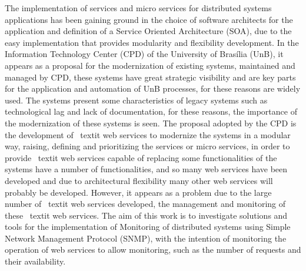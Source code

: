 The implementation of services and micro services for distributed systems applications has been gaining ground in the choice of software architects for the application and definition of a Service Oriented Architecture (SOA), due to the easy implementation that provides modularity and flexibility development. In the Information Technology Center (CPD) of the University of Brasília (UnB), it appears as a proposal for the modernization of existing systems, maintained and managed by CPD, these systems have great strategic visibility and are key parts for the application and automation of UnB processes, for these reasons are widely used. The systems present some characteristics of legacy systems such as technological lag and lack of documentation, for these reasons, the importance of the modernization of these systems is seen. The proposal adopted by the CPD is the development of \ textit {web services} to modernize the systems in a modular way, raising, defining and prioritizing the services or micro services, in order to provide \ textit {web services} capable of replacing some functionalities of the systems have a number of functionalities, and so many web services have been developed and due to architectural flexibility many other web services will probably be developed. However, it appears as a problem due to the large number of \ textit {web services} developed, the management and monitoring of these \ textit {web services}. The aim of this work is to investigate solutions and tools for the implementation of Monitoring of distributed systems using Simple Network Management Protocol (SNMP), with the intention of monitoring the operation of web services to allow monitoring, such as the number of requests and their availability.